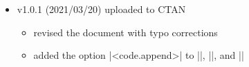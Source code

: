\documentclass[a4paper,amsmath,chapter]{oblivoir}
\begin{document}
\begin{itemize}
\item v1.0.1 (2021/03/20) uploaded to CTAN
  \begin{itemize}
  \item revised the document with typo corrections
  \item added the option |<code.append>| to |\tzframe|, |\tzcircle|, and |\tzellipse|

\end{itemize}
\end{itemize}
\end{document}
